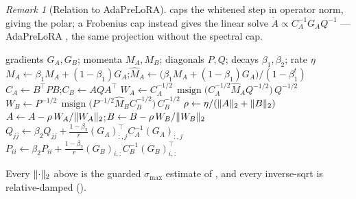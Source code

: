\documentclass[11pt]{article}
\newcommand{\smax}{\sigma_{\max}}
\DeclarePairedDelimiter{\norm}{\lVert}{\rVert}
\DeclareMathOperator{\polar}{msign}          %
\newcommand{\methodname}{\textsc{Polora}\xspace}
\theoremstyle{plain}
\theoremstyle{definition}
\theoremstyle{remark}
\newtheorem{remark}{Remark}
\begin{document}
\begin{remark}[Relation to AdaPreLoRA]
 caps the whitened step in operator norm, giving the polar; a Frobenius cap instead gives the linear solve $\dot A\propto C_A^{-1}G_A Q^{-1}$ --- AdaPreLoRA \cite{adaprelora}, the same projection without the spectral cap.
\end{remark}

\begin{algorithm}[t]
\caption{\methodname{} step for one LoRA pair $(A,B)$ at iteration $t$}
\label{alg:ours}
\begin{algorithmic}[1]
\Require gradients $G_A,G_B$; momenta $M_A,M_B$; diagonals $P,Q$; decays $\beta_1,\beta_2$; rate $\eta$
\State $M_A\gets\beta_1 M_A+(1-\beta_1)G_A$;\quad $\hat M_A\gets\big(\beta_1 M_A+(1-\beta_1)G_A\big)/(1-\beta_1^{t})$ 
\State $C_A\gets B^\top P B$;\quad $C_B\gets A Q A^\top$ 
\State $W_A\gets C_A^{-1/2}\,\polar\!\big(C_A^{-1/2}\hat M_A Q^{-1/2}\big)\,Q^{-1/2}$
\State $W_B\gets P^{-1/2}\,\polar\!\big(P^{-1/2}\hat M_B C_B^{-1/2}\big)\,C_B^{-1/2}$
\State $\rho\gets\eta/(\norm{A}_2+\norm{B}_2)$
\State $A\gets A-\rho\,W_A/\norm{W_A}_2$;\quad $B\gets B-\rho\,W_B/\norm{W_B}_2$
\State $Q_{jj}\gets\beta_2 Q_{jj}+\tfrac{1-\beta_2}{r}(G_A)_{:,j}^\top C_A^{-1}(G_A)_{:,j}$
\State $P_{ii}\gets\beta_2 P_{ii}+\tfrac{1-\beta_2}{r}(G_B)_{i,:}C_B^{-1}(G_B)_{i,:}^\top$
\end{algorithmic}
\end{algorithm}
\noindent Every $\norm{\cdot}_2$ above is the guarded $\smax$ estimate of , and every inverse-sqrt is relative-damped ().
\end{document}
